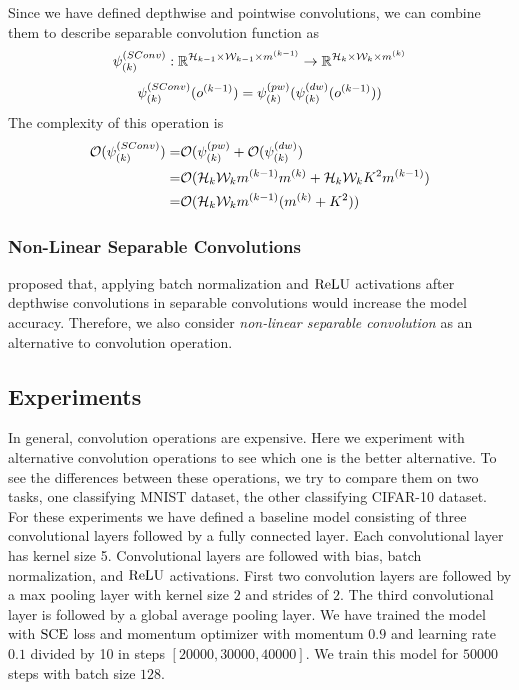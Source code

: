 Since we have defined depthwise and pointwise convolutions, we can combine them to describe separable convolution function as
$$\psi^{(SConv)}_{(k)} : \mathbb{R}^{\mathcal{H}_{k-1} \times \mathcal{W}_{k-1} \times m^{(k-1)}} \rightarrow \mathbb{R}^{\mathcal{H}_{k} \times \mathcal{W}_{k} \times m^{(k)}}$$
$$ \psi^{(SConv)}_{(k)}(o^{(k-1)}) = \psi^{(pw)}_{(k)} ( \psi^{(dw)}_{(k)}(o^{(k-1)}) ) $$
The complexity of this operation is
\begin{equation*}
\begin{split}
\mathcal{O}(\psi^{(SConv)}_{(k)}) =& \mathcal{O}(\psi^{(pw)}_{(k)} + \mathcal{O} (\psi^{(dw)}_{(k)}) \\
=& \mathcal{O}(\mathcal{H}_{k}\mathcal{W}_{k}m^{(k-1)}m^{(k)} + \mathcal{H}_{k}\mathcal{W}_{k}K^2m^{(k-1)}) \\
=& \mathcal{O}(\mathcal{H}_{k}\mathcal{W}_{k}m^{(k-1)}(m^{(k)} + K^2))
\end{split}
 \end{equation*}

\subsubsection{Non-Linear Separable Convolutions}
\cite{howard2017mobilenets} proposed that, applying batch normalization and $\textrm{ReLU}$ activations after depthwise convolutions in separable convolutions would increase the model accuracy. Therefore, we also consider \textit{non-linear separable convolution} as an alternative to convolution operation.

\subsection{Experiments}
In general, convolution operations are expensive. Here we experiment with alternative convolution operations to see which one is the better alternative. To see the differences between these operations, we try to compare them on two tasks, one classifying MNIST dataset, the other classifying CIFAR-10 dataset. For these experiments we have defined a baseline model consisting of three convolutional layers followed by a fully connected layer. Each convolutional layer has kernel size 5. Convolutional layers are followed with bias, batch normalization, and $\textrm{ReLU}$ activations. First two convolution layers are followed by a max pooling layer with kernel size $2$ and strides of $2$. The third convolutional layer is followed by a global average pooling layer. We have trained the model with $\textrm{SCE}$ loss and momentum optimizer with momentum $0.9$ and learning rate $0.1$ divided by 10 in steps $[20000, 30000, 40000]$. We train this model for $50000$ steps with batch size $128$. 

